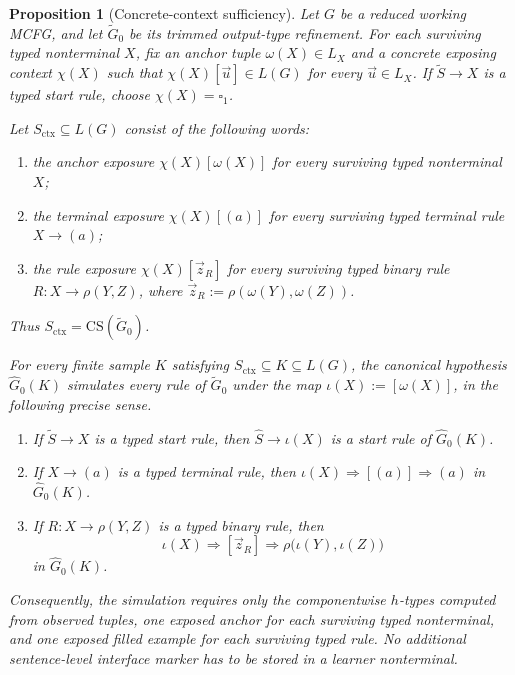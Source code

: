 \documentclass[11pt,a4paper]{article}
\newtheorem{proposition}[theorem]{Proposition}
\theoremstyle{remark}
\newcommand{\CS}{\mathrm{CS}}
\newcommand{\tuple}[1]{\vec{#1}}
\newcommand{\blank}{\square}
\begin{document}
\begin{proposition}[Concrete-context sufficiency]
\label{prop:concrete-context-sufficiency}
Let \(G\) be a reduced working MCFG, and let \(\widetilde G_0\) be its trimmed
output-type refinement.  For each surviving typed nonterminal \(X\), fix an
anchor tuple \(\omega(X)\in L_X\) and a concrete exposing context \(\chi(X)\)
such that \(\chi(X)[\tuple u]\in L(G)\) for every \(\tuple u\in L_X\).  If
\(\widetilde S\to X\) is a typed start rule, choose
\(\chi(X)=\blank_1\).

Let \(S_{\mathrm{ctx}}\subseteq L(G)\) consist of the following words:
\begin{enumerate}[label=(\roman*),leftmargin=*]
\item the anchor exposure \(\chi(X)[\omega(X)]\) for every surviving typed
      nonterminal \(X\);
\item the terminal exposure \(\chi(X)[(a)]\) for every surviving typed terminal
      rule \(X\to(a)\);
\item the rule exposure \(\chi(X)[\tuple z_R]\) for every surviving typed
      binary rule \(R\colon X\to\rho(Y,Z)\), where
      \(\tuple z_R:=\rho(\omega(Y),\omega(Z))\).
\end{enumerate}
Thus \(S_{\mathrm{ctx}}=\CS(\widetilde G_0)\).

For every finite sample \(K\) satisfying
\(S_{\mathrm{ctx}}\subseteq K\subseteq L(G)\), the canonical hypothesis
\(\widehat G_0(K)\) simulates every rule of \(\widetilde G_0\) under the map
\(\iota(X):=[\omega(X)]\), in the following precise sense.
\begin{enumerate}[label=(\roman*),leftmargin=*]
\item If \(\widetilde S\to X\) is a typed start rule, then
      \(\widehat S\to\iota(X)\) is a start rule of \(\widehat G_0(K)\).
\item If \(X\to(a)\) is a typed terminal rule, then
      \(\iota(X)\Rightarrow[(a)]\Rightarrow(a)\) in \(\widehat G_0(K)\).
\item If \(R\colon X\to\rho(Y,Z)\) is a typed binary rule, then
      \[
        \iota(X)\Rightarrow[\tuple z_R]\Rightarrow
        \rho\bigl(\iota(Y),\iota(Z)\bigr)
      \]
      in \(\widehat G_0(K)\).
\end{enumerate}

Consequently, the simulation requires only the componentwise \(h\)-types
computed from observed tuples, one exposed anchor for each surviving typed
nonterminal, and one exposed filled example for each surviving typed rule.  No
additional sentence-level interface marker has to be stored in a learner
nonterminal.
\end{proposition}
\end{document}
